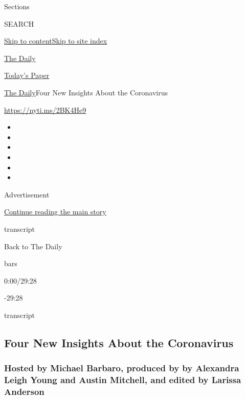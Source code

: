 Sections

SEARCH

\protect\hyperlink{site-content}{Skip to
content}\protect\hyperlink{site-index}{Skip to site index}

\href{https://www.nytimes.com/podcasts/the-daily}{The Daily}

\href{https://myaccount.nytimes.com/auth/login?response_type=cookie\&client_id=vi}{}

\href{https://www.nytimes.com/section/todayspaper}{Today's Paper}

\href{/podcasts/the-daily}{The Daily}\textbar{}Four New Insights About
the Coronavirus

\url{https://nyti.ms/2BK4He9}

\begin{itemize}
\item
\item
\item
\item
\item
\item
\end{itemize}

Advertisement

\protect\hyperlink{after-top}{Continue reading the main story}

transcript

Back to The Daily

bars

0:00/29:28

-29:28

transcript

\hypertarget{four-new-insights-about-the-coronavirus}{%
\subsection{Four New Insights About the
Coronavirus}\label{four-new-insights-about-the-coronavirus}}

\hypertarget{hosted-by-michael-barbaro-produced-by-by-alexandra-leigh-young-and-austin-mitchell-and-edited-by-larissa-anderson}{%
\subsubsection{Hosted by Michael Barbaro, produced by by Alexandra Leigh
Young and Austin Mitchell, and edited by Larissa
Anderson}\label{hosted-by-michael-barbaro-produced-by-by-alexandra-leigh-young-and-austin-mitchell-and-edited-by-larissa-anderson}}

